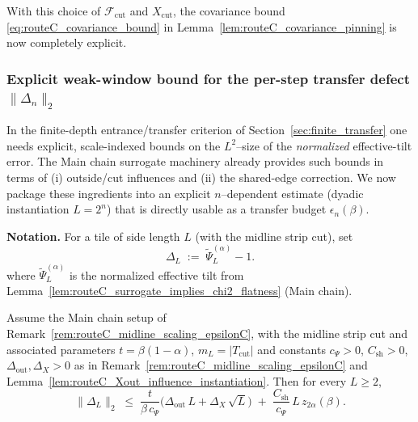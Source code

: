 \noindent
With this choice of $\mathcal F_{\mathrm{cut}}$ and $X_{\mathrm{cut}}$, the covariance bound \eqref{eq:routeC_covariance_bound} in Lemma~\ref{lem:routeC_covariance_pinning}
is now completely explicit.













\subsubsection{Explicit weak-window bound for the per-step transfer defect \texorpdfstring{$\|\Delta_n\|_2$}{||Delta\_n||\_2}}
\label{sec:explicit_Delta_n_bound}

In the finite-depth entrance/transfer criterion of Section~\ref{sec:finite_transfer} one needs
explicit, scale-indexed bounds on the $L^2$--size of the \emph{normalized} effective-tilt error.
The Main chain surrogate machinery already provides such bounds in terms of (i) outside/cut influences
and (ii) the shared-edge correction. We now package these ingredients into an explicit
$n$--dependent estimate (dyadic instantiation $L=2^n$) that is directly usable as a transfer budget
$\epsilon_n(\beta)$.

\medskip

\noindent\textbf{Notation.}
For a tile of side length $L$ (with the midline strip cut), set
\begin{equation}\label{eq:h52_DeltaL_def}
\Delta_L \;:=\; \widetilde\Psi_L^{(\alpha)}-1.
\end{equation}
where $\widetilde\Psi_L^{(\alpha)}$ is the normalized effective tilt from
Lemma~\ref{lem:routeC_surrogate_implies_chi2_flatness} (Main chain).

\begin{proposition}
\label{prop:h52_explicit_DeltaL_bound}
Assume the Main chain setup of Remark~\ref{rem:routeC_midline_scaling_epsilonC}, with the midline strip cut
and associated parameters $t=\beta(1-\alpha)$, $m_L=|T_{\mathrm{cut}}|$ and constants
$c_\Psi>0$, $C_{\mathrm{sh}}>0$, $\Delta_{\mathrm{out}},\Delta_X>0$ as in
Remark~\ref{rem:routeC_midline_scaling_epsilonC} and
Lemma~\ref{lem:routeC_Xout_influence_instantiation}.
Then for every $L\ge 2$,
\begin{equation}
\label{eq:h52_master_bound_DeltaL}
\|\Delta_L\|_2
\;\le\;
\frac{t}{\beta\,c_\Psi}\Big(\Delta_{\mathrm{out}}\,L+\Delta_X\,\sqrt{L}\Big)
\;+\;
\frac{C_{\mathrm{sh}}}{c_\Psi}\,L\,z_{2\alpha}(\beta).
\end{equation}
\end{proposition}

